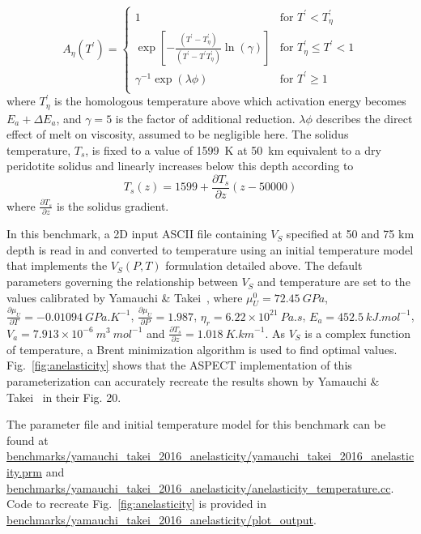 \documentclass{article}
\newcommand{\aspect}{\textsc{ASPECT}}
\begin{document}
\begin{equation}
A_\eta(T^{\prime}) =
\begin{cases}
1  & \text{for } T^{\prime} < T^{\prime}_{\eta} \\
\exp \left[-\frac{(T^{\prime}-T^{\prime}_{\eta})}{(T^{\prime}-T^{\prime}T^{\prime}_{\eta})} \ln(\gamma)\right]& \text{for }T^{\prime}_{\eta} \leq T^{\prime} < 1 \\
\gamma^{-1} \exp(\lambda\phi) & \text{for }T^{\prime} \geq 1\\
\end{cases}
\end{equation}
where $T^{\prime}_\eta$ is the homologous temperature above which activation energy becomes $E_a + \Delta E_a$, and $\gamma = 5$ is the factor of additional reduction. $\lambda\phi$ describes the direct effect of melt on viscosity, assumed to be negligible here. The solidus temperature, $T_s$, is fixed to a value of 1599~K at 50~km equivalent to a dry peridotite solidus \cite{Hirsch2000} and linearly increases below this depth according to
\begin{equation}
T_{s}(z) = 1599 + \frac {\partial T_s}{\partial z} (z - 50000)
\label{eq:Ts}
\end{equation}
where $\frac {\partial T_s}{\partial z}$ is the solidus gradient.

In this benchmark, a 2D input ASCII file containing $V_S$ specified at 50 and 75 km depth is read in and converted to temperature using an initial temperature model that implements the $V_{S}(P,T)$ formulation detailed above. The default parameters governing the relationship between $V_S$ and temperature are set to the values calibrated by Yamauchi \& Takei~\cite{YT16}, where $\mu_U^0 = 72.45~\si{GPa}$, $\frac{\partial{\mu_U}}{\partial{T}} = -0.01094~\si{GPa . K}^{-1}$, $\frac{\partial{\mu_U}}{\partial{P}} = 1.987$,  $\eta_r = 6.22 \times 10^{21}~\si{Pa . s}$, $E_a = 452.5~\si{kJ . mol}^{-1}$, $V_a = 7.913 \times 10^{-6}~\si{m}^{3}~\si{mol}^{-1}$ and $\frac{\partial T_s}{\partial z} = 1.018~\si{K . km}^{-1}$. As $V_S$ is a complex function of temperature, a Brent minimization algorithm is used to find optimal values. Fig.~\ref{fig:anelasticity} shows that the \aspect{} implementation of this parameterization can accurately recreate the results shown by Yamauchi \& Takei~\cite{YT16} in their Fig. 20.

The parameter file and initial temperature model for this benchmark can be found at \url{benchmarks/yamauchi_takei_2016_anelasticity/yamauchi_takei_2016_anelasticity.prm} and \url{benchmarks/yamauchi_takei_2016_anelasticity/anelasticity_temperature.cc}. Code to recreate  Fig.~\ref{fig:anelasticity}  is provided in \url{benchmarks/yamauchi_takei_2016_anelasticity/plot_output}.
\end{document}

